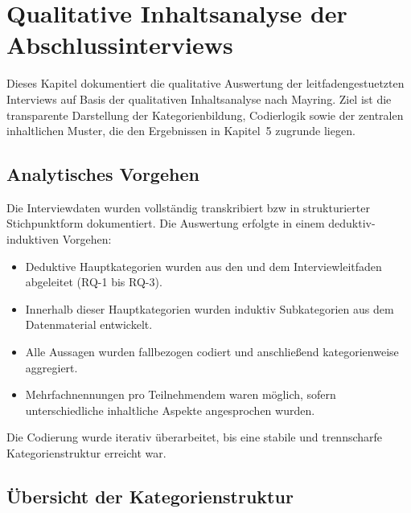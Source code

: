\section{Qualitative Inhaltsanalyse der Abschlussinterviews}
\label{sec:BB-08_qualitative-analysis}

Dieses Kapitel dokumentiert die qualitative Auswertung der leitfadengestuetzten Interviews auf Basis der qualitativen Inhaltsanalyse nach Mayring. Ziel ist die transparente Darstellung der Kategorienbildung, Codierlogik sowie der zentralen inhaltlichen Muster, die den Ergebnissen in Kapitel~5 zugrunde liegen.

\subsection{Analytisches Vorgehen}

Die Interviewdaten wurden vollständig transkribiert \acrshort{bzw} in strukturierter Stichpunktform dokumentiert. Die Auswertung erfolgte in einem deduktiv-induktiven Vorgehen:

\begin{itemize}
  \item Deduktive Hauptkategorien wurden aus den  und dem Interviewleitfaden abgeleitet (RQ-1 bis RQ-3).
  \item Innerhalb dieser Hauptkategorien wurden induktiv Subkategorien aus dem Datenmaterial entwickelt.
  \item Alle Aussagen wurden fallbezogen codiert und anschließend kategorienweise aggregiert.
  \item Mehrfachnennungen pro Teilnehmendem waren möglich, sofern unterschiedliche inhaltliche Aspekte angesprochen wurden.
\end{itemize}

Die Codierung wurde iterativ überarbeitet, bis eine stabile und trennscharfe Kategorienstruktur erreicht war.


\subsection{Übersicht der Kategorienstruktur}

